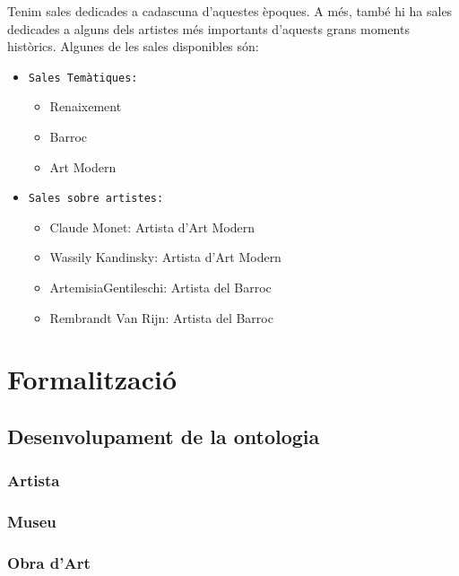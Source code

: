 \documentclass[a4paper]{article}
\begin{document}
	Tenim sales dedicades a cadascuna d'aquestes èpoques. A més, també hi ha sales dedicades a alguns dels artistes més importants d'aquests grans moments històrics. Algunes de les sales disponibles són:
	
	\begin{itemize}
		\item \texttt{Sales Temàtiques: } 
		\begin{itemize}
			\item Renaixement
			\item Barroc
			\item Art Modern
		\end{itemize}
	\end{itemize}
	
	\begin{itemize}
		\item \texttt{Sales sobre artistes: } 
		\begin{itemize}
			\item Claude Monet: Artista d'Art Modern
			\item Wassily Kandinsky: Artista d'Art Modern
			\item ArtemisiaGentileschi: Artista del Barroc
			\item Rembrandt Van Rijn: Artista del Barroc
		\end{itemize}
	\end{itemize}
	
	\newpage
	\section{Formalització}
	
	\subsection{Desenvolupament de la ontologia}
	
	\subsubsection*{Artista}
	
	\subsubsection*{Museu}
	
	\subsubsection*{Obra d'Art}
	
\end{document}
